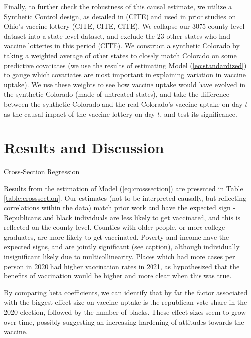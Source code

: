 \documentclass[12pt]{article}
\begin{document}
\begin{spacing}{1.5}
		Finally, to further check the robustness of this causal estimate, we utilize a Synthetic Control design, as detailed in (CITE) and used in prior studies on Ohio's vaccine lottery (CITE, CITE, CITE). We collapse our 3075 county level dataset into a state-level dataset, and exclude the 23 other states who had vaccine lotteries in this period (CITE). We construct a synthetic Colorado by taking a weighted average of other states to closely match Colorado on some predictive covariates (we use the results of estimating Model (\ref{eq:standardized}) to gauge which covariates are most important in explaining variation in vaccine uptake). We use these weights to see how vaccine uptake would have evolved in the synthetic Colorado (made of untreated states), and take the difference between the synthetic Colorado and the real Colorado's vaccine uptake on day $t$ as the causal impact of the vaccine lottery on day $t$, and test its significance.
		
		\section{Results and Discussion}
		
		\begin{table}
			\centering
			\caption{Cross-Section Regression}
			\centerline{}
			\label{table:crosssection}
		\end{table}
		
		Results from the estimation of Model (\ref{eq:crosssection}) are presented in Table \ref{table:crosssection}. Our estimates (not to be interpreted causally, but reflecting correlations within the data) match prior work and have the expected sign - Republicans and black individuals are less likely to get vaccinated, and this is reflected on the county level. Counties with older people, or more college graduates, are more likely to get vaccinated. Poverty and income have the expected signs, and are jointly significant (see caption), although individually insignificant likely due to multicollinearity. Places which had more cases per person in 2020 had higher vaccination rates in 2021, as hypothesized that the benefits of vaccination would be higher and more clear when this was true.
		
		By comparing beta coefficients, we can identify that by far the factor associated with the biggest effect size on vaccine uptake is the republican vote share in the 2020 election, followed by the number of blacks. These effect sizes seem to grow over time, possibly suggesting an increasing hardening of attitudes towards the vaccine.
		

\end{spacing}
\end{document}
